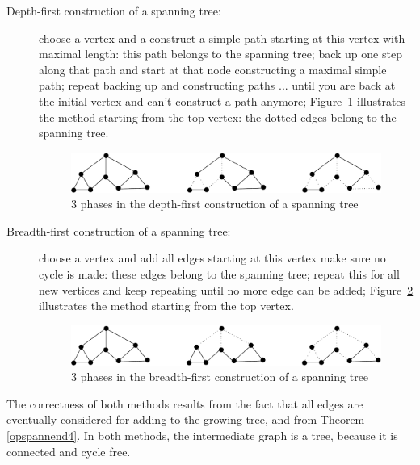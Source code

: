 \begin{description}
\item[Depth-first construction of a spanning tree:] choose a vertex
and a construct a simple path starting at this vertex with maximal
length: this path belongs to the spanning tree; back up one step along
that path and start at that node constructing a maximal simple path;
repeat backing up and constructing paths ... until you are back at the
initial vertex and can't construct a path anymore;
Figure~\ref{diepteeerst1} illustrates the method starting from the top
vertex: the dotted edges belong to the spanning tree.
\begin{figure}[ht]
\begin{center}
\includegraphics[width=0.6\linewidth,keepaspectratio]{diepteeerst1}
\end{center}
\caption{3 phases in the depth-first construction of a spanning
tree \label{diepteeerst1}}
\end{figure}

\item[Breadth-first construction of a spanning tree:]
choose a vertex and add all edges starting at this vertex make sure no
cycle is made: these edges belong to the spanning tree; repeat this
for all new vertices and keep repeating until no more edge can be
added; Figure~\ref{breedteeerst1} illustrates the method starting from
the top vertex.


\begin{figure}[ht]
\begin{center}
\includegraphics[width=0.6\linewidth,keepaspectratio]{breedteeerst1}
\end{center}
\caption{3 phases in the breadth-first construction of a spanning tree \label{breedteeerst1}}
\end{figure}
\end{description}


The correctness of both methods results from the fact that all edges
are eventually considered for adding to the growing tree, and from
Theorem \ref{opspannend4}. In both methods, the intermediate graph is
a tree, because it is connected and cycle free.

